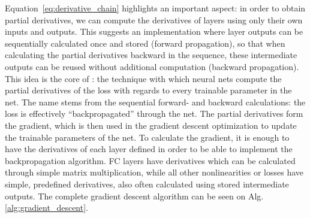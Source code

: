 			Equation~\ref{eq:derivative_chain} highlights an important aspect: in order to obtain partial derivatives, we can compute the derivatives of layers using only their own inputs and outputs.
			This suggests an implementation where layer outputs can be sequentially calculated once and stored (forward propagation), so that when calculating the partial derivatives backward in the sequence, these intermediate outputs can be reused without additional computation (backward propagation).
			This idea is the core of : the technique with which neural nets compute the partial derivatives of the loss with regards to every trainable parameter in the net.
			The name stems from the sequential forward- and backward calculations: the loss is effectively ``backpropagated'' through the net.
			The partial derivatives form the gradient, which is then used in the gradient descent optimization to update the trainable parameters of the net.
			To calculate the gradient, it is enough to have the derivatives of each layer defined in order to be able to implement the backpropagation algorithm.
			\ac{FC} layers have derivatives which can be calculated through simple matrix multiplication, while all other nonlinearities or losses have simple, predefined derivatives, also often calculated using stored intermediate outputs.
			The complete gradient descent algorithm can be seen on Alg. \ref{alg:gradient_descent}.
			

